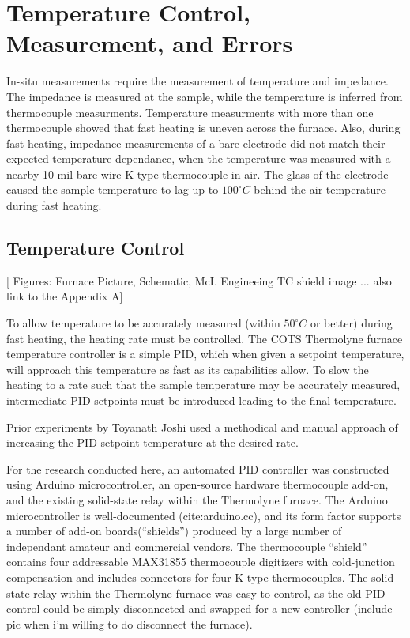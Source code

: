 \documentclass[12pt,oneside,english]{article}
\begin{document}
	\clearpage 
	\section{Temperature Control, Measurement, and Errors}

	In-situ measurements require the measurement of temperature and impedance.  
	The impedance is measured at the sample, while the temperature is inferred from thermocouple measurments.
	Temperature measurments with more than one thermocouple showed that fast heating is uneven across the furnace.  
	Also, during fast heating, impedance measurements of a bare electrode did not match their expected temperature dependance, when the temperature was measured with a nearby 10-mil bare wire K-type thermocouple in air.
	The glass of the electrode caused the sample temperature to lag up to $100^{\circ}C$ behind the air temperature during fast heating.

	\subsection{Temperature Control}

	[ Figures: Furnace Picture, Schematic, McL Engineeing TC shield image ... also link to the Appendix A]

	To allow temperature to be accurately measured (within $50^{\circ}C$ or better) during fast heating, the heating rate must be controlled.
	The COTS Thermolyne furnace temperature controller is a simple PID, which when given a setpoint temperature, will approach this temperature as fast as its capabilities allow.
	To slow the heating to a rate such that the sample temperature may be accurately measured, intermediate PID setpoints must be introduced leading to the final temperature.

	Prior experiments by Toyanath Joshi used a methodical and manual approach of increasing the PID setpoint temperature at the desired rate.
	
	For the research conducted here, an automated PID controller was constructed using Arduino microcontroller, an open-source hardware thermocouple add-on, and the existing solid-state relay within the Thermolyne furnace.  
	The Arduino microcontroller is well-documented (cite:arduino.cc), and its form factor supports a number of add-on boards(``shields'') produced by a large number of independant amateur and commercial vendors.
	The thermocouple ``shield'' contains four addressable MAX31855 thermocouple digitizers with cold-junction compensation and includes connectors for four K-type thermocouples.
	The solid-state relay within the Thermolyne furnace was easy to control, as the old PID control could be simply disconnected and swapped for a new controller (include pic when i'm willing to do disconnect the furnace).
\end{document}
